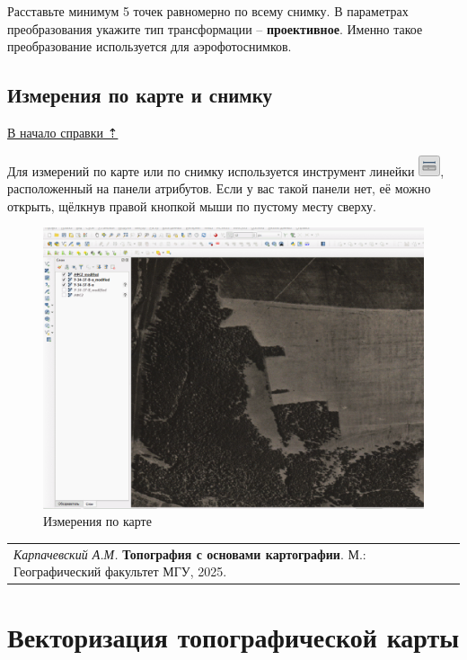 \documentclass[
  12pt,
]{book}
\begin{document}
Расставьте минимум 5 точек равномерно по всему снимку. В параметрах преобразования укажите тип трансформации -- \textbf{проективное}. Именно такое преобразование используется для аэрофотоснимков.

\section{Измерения по карте и снимку}\label{georeference-measure}

\hyperref[georeference]{В начало справки ⇡}

Для измерений по карте или по снимку используется инструмент линейки \includegraphics{images/Georeference/Measure.png}, расположенный на панели атрибутов. Если у вас такой панели нет, её можно открыть, щёлкнув правой кнопкой мыши по пустому месту сверху.

\begin{figure}
\centering
\includegraphics{images/Georeference/Measuring.gif}
\caption{Измерения по карте}
\end{figure}

\begin{longtable}[]{@{}l@{}}
\toprule\noalign{}
\endhead
\bottomrule\noalign{}
\endlastfoot
\emph{Карпачевский А.М.} \textbf{Топография с основами картографии}. М.: Географический факультет МГУ, 2025. \\
\end{longtable}

\chapter{Векторизация топографической карты}\label{digitize}
\end{document}
